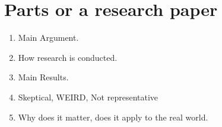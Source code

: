 \documentclass{article}
\begin{document}
\section*{Parts or a research paper}
\begin{enumerate}
    \item Main Argument.  
    \item How research is conducted. 
    \item Main Results. 
    \item Skeptical, WEIRD, Not representative
    \item Why does it matter, does it apply to the real world. 
\end{enumerate}
\end{document}
